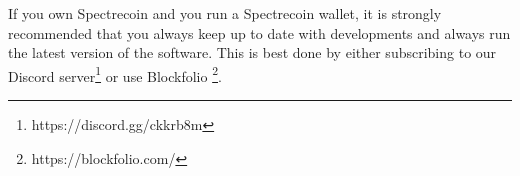 If you own Spectrecoin and you run a Spectrecoin wallet, it is strongly
recommended that you always keep up to date with developments and always run
the latest version of the software. This is best done by either subscribing
to our Discord server\footnote{https://discord.gg/ckkrb8m} or use Blockfolio
\footnote{https://blockfolio.com/}.
